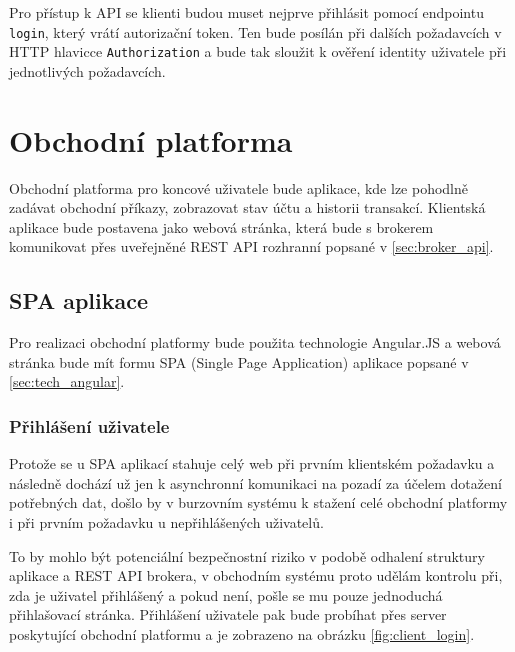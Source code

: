 \documentclass[thesis=M,czech]{FITthesis}[2012/06/26]
\begin{document}
	Pro přístup k API se klienti budou muset nejprve přihlásit pomocí endpointu \texttt{login}, který vrátí autorizační token. Ten bude posílán při dalších požadavcích v HTTP hlavicce \texttt{Authorization} a bude tak sloužit k ověření identity uživatele při jednotlivých požadavcích.
	
	
\section{Obchodní platforma}
	
	Obchodní platforma pro koncové uživatele bude aplikace, kde lze pohodlně zadávat obchodní příkazy, zobrazovat stav účtu a historii transakcí. Klientská aplikace bude postavena jako webová stránka, která bude s brokerem komunikovat přes uveřejněné REST API rozhranní popsané v \ref{sec:broker_api}.


\subsection{SPA aplikace}
	
	Pro realizaci obchodní platformy bude použita technologie Angular.JS a webová stránka bude mít formu SPA (Single Page Application) aplikace popsané v \ref{sec:tech_angular}.


\subsubsection{Přihlášení uživatele}
\label{sec:login_process}

	Protože se u SPA aplikací stahuje celý web při prvním klientském požadavku a následně dochází už jen k asynchronní komunikaci na pozadí za účelem dotažení potřebných dat, došlo by v burzovním systému k stažení celé obchodní platformy i při prvním požadavku u nepřihlášených uživatelů.
	
	To by mohlo být potenciální bezpečnostní riziko v podobě odhalení struktury aplikace a REST API brokera, v obchodním systému proto udělám kontrolu při, zda je uživatel přihlášený a pokud není, pošle se mu pouze jednoduchá přihlašovací stránka. Přihlášení uživatele pak bude probíhat přes server poskytující obchodní platformu a je zobrazeno na obrázku \ref{fig:client_login}.
\end{document}
